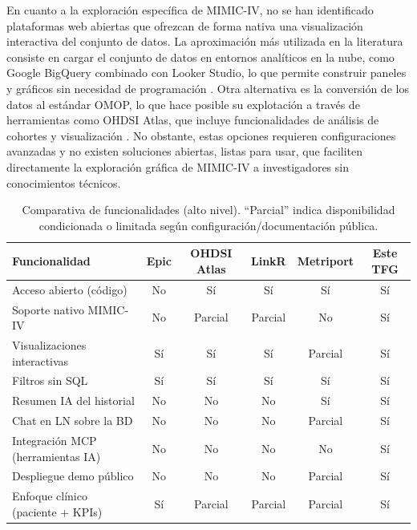 En cuanto a la exploración específica de MIMIC-IV, no se han identificado plataformas web abiertas que ofrezcan de forma nativa una visualización interactiva del conjunto de datos. La aproximación más utilizada en la literatura consiste en cargar el conjunto de datos en entornos analíticos en la nube, como Google BigQuery combinado con Looker Studio, lo que permite construir paneles y gráficos sin necesidad de programación \cite{bigquery_mimic}. Otra alternativa es la conversión de los datos al estándar OMOP, lo que hace posible su explotación a través de herramientas como OHDSI Atlas, que incluye funcionalidades de análisis de cohortes y visualización \cite{OHDSI_Atlas, MIMICIV_OMOP_Demo}. No obstante, estas opciones requieren configuraciones avanzadas y no existen soluciones abiertas, listas para usar, que faciliten directamente la exploración gráfica de MIMIC-IV a investigadores sin conocimientos técnicos.



\begin{table}[H]
    \centering
    \small
    \begin{tabular}{|l|c|c|c|c|c|}
        \hline
        \textbf{Funcionalidad} & \textbf{Epic} & \textbf{OHDSI Atlas} & \textbf{LinkR} & \textbf{Metriport} & \textbf{Este TFG} \\
        \hline
        Acceso abierto (código) & No & Sí & Sí & Sí & Sí \\
        Soporte nativo MIMIC-IV & No & Parcial & Parcial & No & Sí \\
        Visualizaciones interactivas & Sí & Sí & Sí & Parcial & Sí \\
        Filtros sin SQL & Sí & Sí & Sí & Sí & Sí \\
        Resumen IA del historial & No & No & No & Sí & Sí \\
        Chat en LN sobre la BD & No & No & No & Parcial & Sí \\
        Integración MCP (herramientas IA) & No & No & No & No & Sí \\
        Despliegue demo público & No & No & No & Parcial & Sí \\
        Enfoque clínico (paciente + KPIs) & Sí & Parcial & Parcial & Parcial & Sí \\
        \hline
    \end{tabular}
    \caption{Comparativa de funcionalidades (alto nivel). “Parcial” indica disponibilidad condicionada o limitada según configuración/documentación pública.}
    \label{tab:comparativa_apps}
\end{table}



